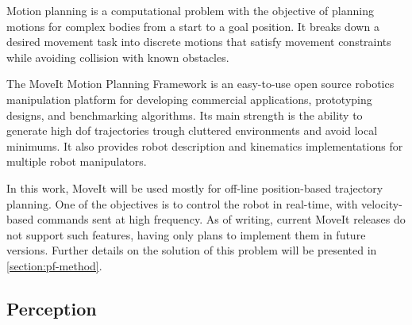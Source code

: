 \par Motion planning is a computational problem with the objective of planning motions for complex bodies from a start to a goal position. It breaks down a desired movement task into discrete motions that satisfy movement constraints while avoiding collision with known obstacles. 
\par The MoveIt Motion Planning Framework \cite{moveit.paper, moveit.online} is an easy-to-use open source robotics manipulation platform for developing commercial applications, prototyping designs, and benchmarking algorithms. Its main strength is the ability to generate high \ac{dof} trajectories trough cluttered environments and avoid local minimums. It also provides robot description and kinematics implementations for multiple robot manipulators. 
\par In this work, MoveIt will be used mostly for off-line position-based trajectory planning. One of the objectives is to control the robot in real-time, with velocity-based commands sent at high frequency. As of writing, current MoveIt releases do not support such features, having only plans to implement them in future versions. Further details on the solution of this problem will be presented in \autoref{section:pf-method}.


\subsection{Perception}

